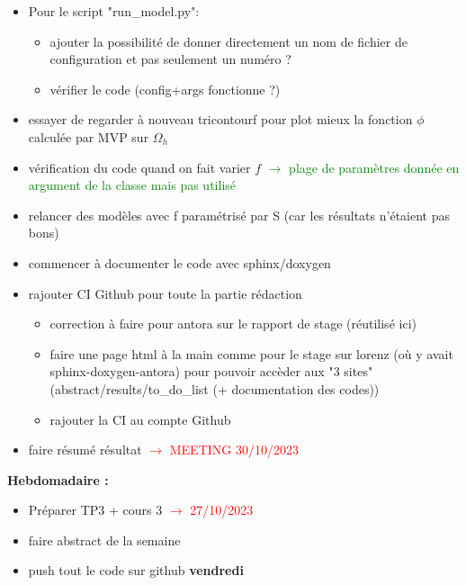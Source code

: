 \begin{itemize}[label=$\square$]
	\item Pour le script "run\_model.py":
	\begin{itemize}[label=\LARGE $\circ$]
		\item[\swontfix] ajouter la possibilité de donner directement un nom de fichier de configuration et pas seulement un numéro ?
		\item vérifier le code (config+args fonctionne ?)
	\end{itemize}
	\item essayer de regarder à nouveau tricontourf pour plot mieux la fonction $\phi$ calculée par MVP sur $\Omega_h$
	\item[\done] vérification du code quand on fait varier $f$ \textcolor{Green}{$\rightarrow$ plage de paramètres donnée en argument de la classe mais pas utilisé}
	\item[\done] relancer des modèles avec f paramétrisé par S (car les résultats n'étaient pas bons)
	\item commencer à documenter le code avec sphinx/doxygen
	\item rajouter CI Github pour toute la partie rédaction
	\begin{itemize}[label=\LARGE $\circ$]
		\item correction à faire pour antora sur le rapport de stage (réutilisé ici)
		\item[\swontfix] faire une page html à la main comme pour le stage sur lorenz (où y avait sphinx-doxygen-antora) pour pouvoir accèder aux "3 sites" (abstract/results/to\_do\_list (+ documentation des codes))
		\item[\done] rajouter la CI au compte Github
	\end{itemize}
	\item[\done] faire résumé résultat \textcolor{red}{$\rightarrow$ MEETING 30/10/2023}
\end{itemize}
\textbf{Hebdomadaire :}
\begin{itemize}[label=$\square$] 
	\item[\done] Préparer TP3 + cours 3 \textcolor{red}{$\rightarrow$ 27/10/2023}
	\item[\done] faire abstract de la semaine 
	\item[\done] push tout le code sur github \textbf{vendredi}
\end{itemize}